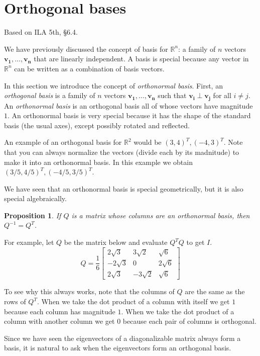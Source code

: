 \documentclass[11pt,oneside]{amsbook}
\newcommand{\R}{\mathbb R}
\theoremstyle{definition}
\theoremstyle{plain}
\newtheorem{proposition}[theorem]{Proposition}
\theoremstyle{definition}
\theoremstyle{remark}
\numberwithin{equation}{section}
\numberwithin{figure}{section}
\begin{document}
\section{Orthogonal bases}

Based on ILA 5th, \S 6.4.

We have previously discussed the concept of basis for $\R^n$: a family of $n$ vectors $\bm{v_1},\ldots,\bm{v_n}$ that are linearly independent. A basis is special because any vector in $\R^n$ can be written as a combination of basis vectors.

In this section we introduce the concept of \emph{orthonormal basis}. First, an \emph{orthogonal basis} is a family of $n$ vectors $\bm{v_1},\ldots,\bm{v_n}$ such that $\bm{v_i}\perp\bm{v_j}$ for all $i\neq j$. An \emph{orthonormal basis} is an orthogonal basis all of whose vectors have magnitude $1$. An orthonormal basis is very special because it has the shape of the standard basis (the usual axes), except possibly rotated and reflected.

An example of an orthogonal basis for $\R^2$ would be $(3,4)^T,(-4,3)^T$. Note that you can always normalize the vectors (divide each by its madnitude) to make it into an orthonormal basis. In this example we obtain $(3/5,4/5)^T,(-4/5,3/5)^T$.

We have seen that an orthonormal basis is special geometrically, but it is also special algebraically.

\begin{proposition}
  If $Q$ is a matrix whose columns are an orthonormal basis, then $Q^{-1}=Q^T$.
\end{proposition}

For example, let $Q$ be the matrix below and evaluate $Q^TQ$ to get $I$.
\[Q=\frac16\begin{bmatrix}
  2\sqrt{3}&3\sqrt{2}&\sqrt{6}\\
  -2\sqrt{3}&0&2\sqrt{6}\\
  2\sqrt{3}&-3\sqrt{2}&\sqrt{6}
\end{bmatrix}
\]

To see why this always works, note that the columns of $Q$ are the same as the rows of $Q^T$. When we take the dot product of a column with itself we get $1$ because each column has magnitude $1$. When we take the dot product of a column with another column we get $0$ because each pair of columns is orthogonal.

Since we have seen the eigenvectors of a diagonalizable matrix always form a basis, it is natural to ask when the eigenvectors form an orthogonal basis.
\end{document}
